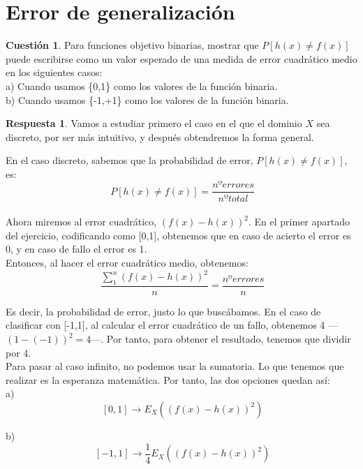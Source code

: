 \documentclass[10pt,a4paper]{article}
\theoremstyle{definition}
\newtheorem*{cuestion}{Cuestión}
\newtheorem*{respuesta}{Respuesta}
\begin{document}
\newpage

\section{Error de generalización}
\begin{cuestion}
Para funciones objetivo binarias, mostrar que $P[h(x) \neq f(x)]$ puede escribirse como un valor esperado de una medida de error cuadrático medio en los siguientes casos:\\
a) Cuando usamos \{0,1\} como los valores de la función binaria.\\
b) Cuando usamos \{-1,+1\} como los valores de la función binaria.
\end{cuestion}
\begin{respuesta}
Vamos a estudiar primero el caso en el que el dominio $X$ sea discreto, por ser más intuitivo, y después obtendremos la forma general.

En el caso discreto, sabemos que la probabilidad de error, $P[h(x) \neq f(x)]$, es:\\

\[
\ P[h(x) \neq f(x)] = \frac{nº errores}{nº total}
\]\\

Ahora miremos al error cuadrático, $(f(x)-h(x))^{2}$. En el primer apartado del ejercicio, codificando como [0,1], obtenemos que en caso de acierto el error es 0, y en caso de fallo el error es 1.\\

Entonces, al hacer el error cuadrático medio, obtenemos:\\

\[
\ \frac{\sum_{1}^{n} (f(x)-h(x))^{2}}{n} = \frac{nº errores}{n}
\]

Es decir, la probabilidad de error, justo lo que buscábamos. En el caso de clasificar con [-1,1], al calcular el error cuadrático de un fallo, obtenemos 4 ---$(1-(-1))^{2} = 4$---. Por tanto, para obtener el resultado, tenemos que dividir por 4.\\

Para pasar al caso infinito, no podemos usar la sumatoria. Lo que tenemos que realizar es la esperanza matemática. Por tanto, las dos opciones quedan así:\\

a)
\[
\ [0,1] \longrightarrow E_{X} \left((f(x)-h(x))^{2}\right)
\]

b)
\[
\ [-1,1] \longrightarrow \frac{1}{4} E_{X} \left((f(x)-h(x))^{2}\right)
\]

\end{respuesta}
\end{document}
